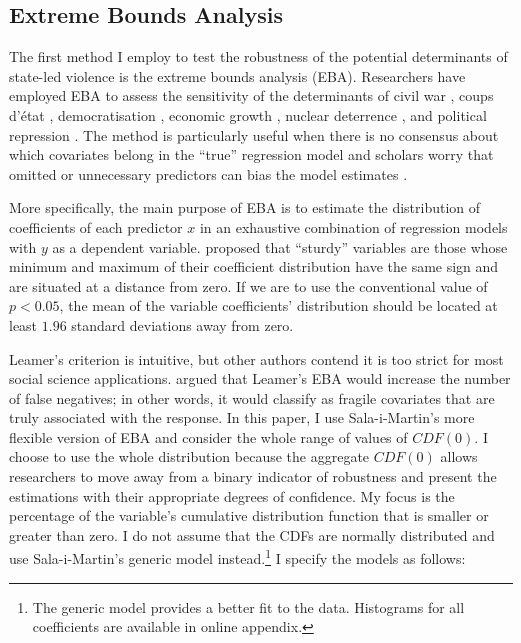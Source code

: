 \documentclass[a4paper,12pt]{article}
\begin{document}
\subsection{Extreme Bounds Analysis}
\label{subsec:eba}

The first method I employ to test the robustness of the potential determinants of state-led violence is the extreme bounds analysis (EBA). Researchers have employed EBA to assess the sensitivity of the determinants of civil war \citep{hegre2006sensitivity}, coups d'état \citep{gassebner2016expect}, democratisation \citep{gassebner2013extreme}, economic growth \citep{levine1992sensitivity, sala1997just}, nuclear deterrence \citep{bell2015examining}, and political repression \citep{hafner2005right}. The method is particularly useful when there is no consensus about which covariates belong in the ``true'' regression model \citep[178]{sala1997just} and scholars worry that omitted or unnecessary predictors can bias the model estimates \citep[60]{angrist2008mostly, clarke2005phantom, elwert2014endogenous, spector2011methodological}.

More specifically, the main purpose of EBA is to estimate the distribution of coefficients of each predictor $x$ in an exhaustive combination of regression models with $y$ as a dependent variable. \cite[308]{leamer1985sensitivity} proposed that ``sturdy'' variables are those whose minimum and maximum of their coefficient distribution have the same sign and are situated at a distance from zero. If we are to use the conventional value of $p < 0.05$, the mean of the variable coefficients' distribution should be located at least $1.96$ standard deviations away from zero. 
	
Leamer's criterion is intuitive, but other authors contend it is too strict for most social science applications. \cite{sala1997just} argued that Leamer's EBA would increase the number of false negatives; in other words, it would classify as fragile covariates that are truly associated with the response. In this paper, I use Sala-i-Martin's \citeyear{sala1997just} more flexible version of EBA and consider the whole range of values of $CDF(0)$. I choose to use the whole distribution because the aggregate $CDF(0)$ allows researchers to move away from a binary indicator of robustness and present the estimations with their appropriate degrees of confidence. My focus is the percentage of the variable's cumulative distribution function that is smaller or greater than zero. I do not assume that the CDFs are normally distributed and use Sala-i-Martin's generic model instead.\footnote{The generic model provides a better fit to the data. Histograms for all coefficients are available in online appendix.} I specify the models as follows:
	
\end{document}
